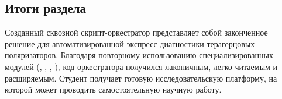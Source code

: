 \subsection{Итоги раздела}
Созданный сквозной скрипт-оркестратор представляет собой законченное решение для автоматизированной экспресс-диагностики терагерцовых поляризаторов. Благодаря повторному использованию специализированных модулей (, , , ), код оркестратора получился лаконичным, легко читаемым и расширяемым. Студент получает готовую исследовательскую платформу, на которой может проводить самостоятельную научную работу.
